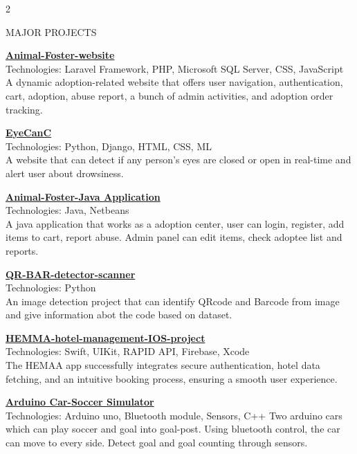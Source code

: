 \documentclass{resume} %
\begin{document}
\begin{paracol}{2}
\begin{rSection}{MAJOR PROJECTS}
\color{blue}
\item \href{https://github.com/mashfi40/animal-foster-laravel}
{\textbf{Animal-Foster-website}}
\color{black}
\\
{Technologies: Laravel Framework, PHP, Microsoft SQL Server, CSS, JavaScript} \\
{A dynamic adoption-related website that offers user navigation, authentication, cart, adoption, abuse report, a bunch of admin activities, and adoption order tracking.}
\color{blue}
\item \href{https://github.com/mashfi40/EyeCanC-system-project}{\textbf{EyeCanC}}\\
\color{black}
{Technologies: Python, Django, HTML, CSS, ML} \\{A website that can detect if any person's eyes are closed or open in real-time and alert user about drowsiness.}
\color{blue}
\item \href{https://github.com/mashfi40/animal-foster-java}{\textbf{Animal-Foster-Java Application}}\\
\color{black}
{Technologies: Java, Netbeans} \\{ A java application that works as a adoption center, user can login, register, add items to cart, report abuse. Admin panel can edit items, check adoptee list and reports.}
\color{blue}
\item \href{https://github.com/mashfi40/QR-BAR-detector-scanner}{\textbf{QR-BAR-detector-scanner}}
\color{black}
\\
{Technologies: Python} \\
{An image detection project that can identify QRcode and Barcode from image and give information abot the code based on dataset.}
\color{blue}
\item \href{https://github.com/Ehsanul-karim/HEMMA-hotel-management-IOS-project}{\textbf{HEMMA-hotel-management-IOS-project}}
\color{black}
\\
{Technologies: Swift, UIKit, RAPID API, Firebase, Xcode} \\
{The HEMAA app successfully integrates secure authentication, hotel data fetching, and an intuitive booking process, ensuring a smooth user experience.}
\color{blue}
\item \href{https://github.com/mashfi40/bluetooth-car-soccer-simulation}{\textbf{Arduino Car-Soccer Simulator}}
\color{black}
\\{Technologies: Arduino uno, Bluetooth module, Sensors, C++ } 
{Two arduino cars which can play soccer and goal into goal-post. Using bluetooth control, the car can move to every side. Detect goal and goal counting through sensors.}

\end{rSection}
\end{paracol}
\end{document}
